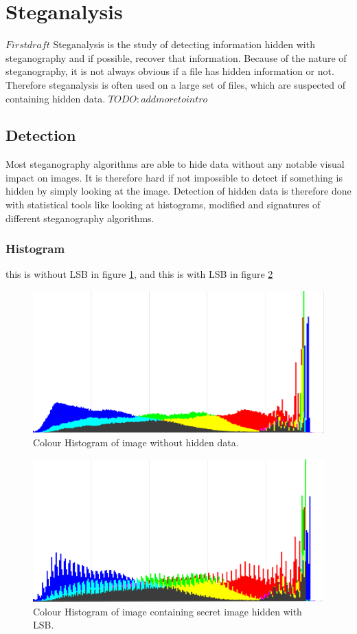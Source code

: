 \section{Steganalysis}$First draft$
Steganalysis is the study of detecting information hidden with steganography and if possible, recover that information.
Because of the nature of steganography, it is not always obvious if a file has hidden information or not.
Therefore steganalysis is often used on a large set of files, which are suspected of containing hidden data.
$TODO: add more to intro$

\subsection*{Detection}
Most steganography algorithms are able to hide data without any notable visual impact on images.
It is therefore hard if not impossible to detect if something is hidden by simply looking at the image.
Detection of hidden data is therefore done with statistical tools like looking at histograms, modified and signatures of different steganography algorithms.

\subsubsection*{Histogram}


this is without LSB in figure \ref{fig:HistoWithoutLSB}, and this is with LSB in figure \ref{fig:HistoWithLSB}

\begin{figure}
	\centering
	\includegraphics[width=1\textwidth]{figures/HistoLSBCat.png}
	\caption{Colour Histogram of image without hidden data.}
	\label{fig:HistoWithoutLSB}
\end{figure}

\begin{figure}
	\centering
	\includegraphics[width=1\textwidth]{figures/HistoLSBCatEncrypted.png}
	\caption{Colour Histogram of image containing secret image hidden with LSB.}
	\label{fig:HistoWithLSB}
\end{figure}